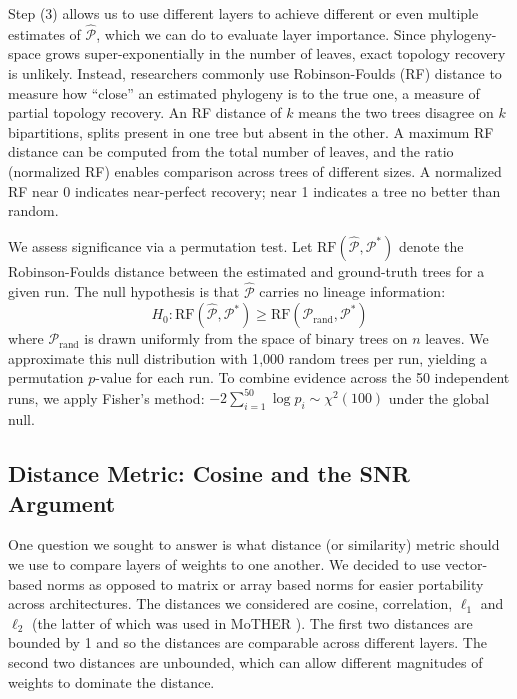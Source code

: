 \documentclass{article}
\begin{document}
Step (3) allows us to use different layers to achieve different or even multiple estimates of $\widehat{\mathcal{P}}$, which we can do to evaluate layer importance.  Since phylogeny-space grows super-exponentially in the number of leaves, exact topology recovery is unlikely.
Instead, researchers commonly use Robinson-Foulds (RF) distance \citep{robinson1981comparison} to measure how ``close'' an estimated phylogeny is to the true one, a measure of partial topology recovery. An RF distance of $k$ means the two trees disagree on $k$ bipartitions, splits present in one tree but absent in the other.
A maximum RF distance can be computed from the total number of leaves, and the ratio (normalized RF) enables comparison across trees of different sizes. A normalized RF near 0 indicates near-perfect recovery; near 1 indicates a tree no better than random.

We assess significance via a permutation test. Let $\mathrm{RF}(\widehat{\mathcal{P}},
\mathcal{P}^*)$ denote the Robinson-Foulds distance between the estimated and
ground-truth trees for a given run. The null hypothesis is that $\widehat{\mathcal{P}}$
carries no lineage information:
$$
H_0: \mathrm{RF}(\widehat{\mathcal{P}}, \mathcal{P}^*) \ge
     \mathrm{RF}(\mathcal{P}_{\text{rand}}, \mathcal{P}^*)
$$
where $\mathcal{P}_{\text{rand}}$ is drawn uniformly from the space of binary trees
on $n$ leaves. We approximate this null distribution with 1{,}000 random trees per
run, yielding a permutation $p$-value for each run. To combine evidence across the
50 independent runs, we apply Fisher's method: $-2\sum_{i=1}^{50} \log p_i \sim
\chi^2(100)$ under the global null.



\subsection{Distance Metric: Cosine and the SNR Argument}
\label{sec:framework:metric}

One question we sought to answer is what distance (or similarity) metric should we use to compare layers of weights to one another.  We decided to use vector-based norms as opposed to matrix or array based norms for easier portability across architectures.  The distances we considered are  cosine, correlation, $\ell_1$ and $\ell_2$ (the latter of which was used in MoTHER \cite{}).  The first two distances are bounded by 1 and so the distances are comparable across different layers.  The second two distances are unbounded, which can allow different magnitudes of weights to dominate the distance.
\end{document}
